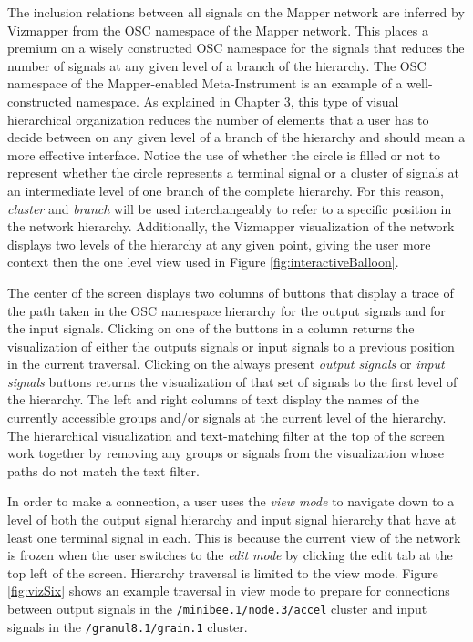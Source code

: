 The inclusion relations between all signals on the Mapper network are inferred by Vizmapper from the OSC namespace of the Mapper network. This places a premium on a wisely constructed OSC namespace for the signals that reduces the number of signals at any given level of a branch of the hierarchy. The OSC namespace of the Mapper-enabled Meta-Instrument is an example of a well-constructed namespace. As explained in Chapter 3, this type of visual hierarchical organization reduces the number of elements that a user has to decide between on any given level of a branch of the hierarchy and should mean a more effective interface. Notice the use of whether the circle is filled or not to represent whether the circle represents a terminal signal or a cluster of signals at an intermediate level of one branch of the complete hierarchy. For this reason, \emph{cluster} and \emph{branch} will be used interchangeably to refer to a specific position in the network hierarchy. Additionally, the Vizmapper visualization of the network displays two levels of the hierarchy at any given point, giving the user more context then the one level view used in Figure \ref{fig:interactiveBalloon}.

The center of the screen displays two columns of buttons that display a trace of the path taken in the OSC namespace hierarchy for the output signals and for the input signals. Clicking on one of the buttons in a column returns the visualization of either the outputs signals or input signals to a previous position in the current traversal. Clicking on the always present \emph{output signals} or \emph{input signals} buttons returns the visualization of that set of signals to the first level of the hierarchy. The left and right columns of text display the names of the currently accessible groups and/or signals at the current level of the hierarchy. The hierarchical visualization and text-matching filter at the top of the screen work together by removing any groups or signals from the visualization whose paths do not match the text filter.

In order to make a connection, a user uses the \emph{view mode} to navigate down to a level of both the output signal hierarchy and input signal hierarchy that have at least one terminal signal in each. This is because the current view of the network is frozen when the user switches to the \emph{edit mode} by clicking the edit tab at the top left of the screen. Hierarchy traversal is limited to the view mode. Figure \ref{fig:vizSix} shows an example traversal in view mode to prepare for connections between output signals in the \verb#/minibee.1/node.3/accel# cluster and input signals in the \verb#/granul8.1/grain.1# cluster.

